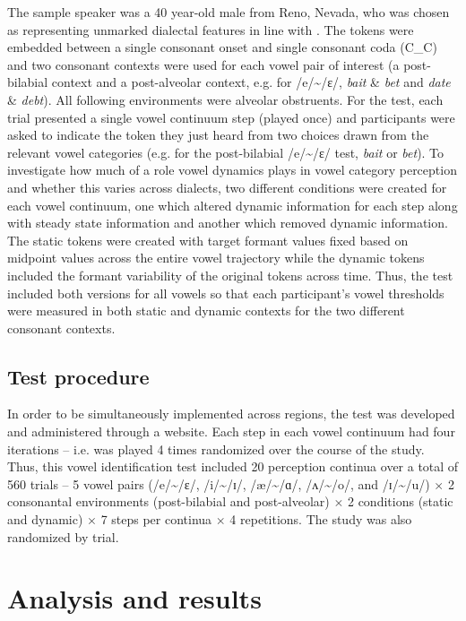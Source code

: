\documentclass[output=paper]{LSP/langsci}
\begin{document}
The sample speaker was a 40 year-old male from Reno, Nevada, who was chosen as representing unmarked dialectal features in line with \citet{clopper_acoustic_2004}. The tokens were embedded between a single consonant onset and single consonant coda (C\_C) and two consonant contexts were used for each vowel pair of interest (a post-bilabial context and a post-alveolar context, e.g. for /e/{\textasciitilde}/ɛ/, \textit{bait} \& \textit{bet} and\textit{ date} \& \textit{debt}). All following environments were alveolar obstruents. For the test, each trial presented a single vowel continuum step (played once) and participants were asked to indicate the token they just heard from two choices drawn from the relevant vowel categories (e.g. for the post-bilabial /e/{\textasciitilde}/ɛ/ test, \textit{bait} or \textit{bet}). To investigate how much of a role vowel dynamics plays in vowel category perception and whether this varies across dialects, two different conditions were created for each vowel continuum, one which altered dynamic information for each step along with steady state information and another which removed dynamic information. The static tokens were created with target formant values fixed based on midpoint values across the entire vowel trajectory while the dynamic tokens included the formant variability of the original tokens across time. Thus, the test included both versions for all vowels so that each participant’s vowel thresholds were measured in both static and dynamic contexts for the two different consonant contexts. 

\subsection{Test procedure}
In order to be simultaneously implemented across regions, the test was developed and administered through a website. Each step in each vowel continuum had four iterations – i.e. was played 4 times randomized over the course of the study. Thus, this vowel identification test included 20 perception continua over a total of 560 trials – 5 vowel pairs (/e/{\textasciitilde}/ɛ/, /i/{\textasciitilde}/ɪ/, /æ/{\textasciitilde}/ɑ/, /ʌ/{\textasciitilde}/o/, and /ɪ/{\textasciitilde}/u/) $\times$ 2 consonantal environments (post-bilabial and post-alveolar) $\times$ 2 conditions (static and dynamic) $\times$ 7 steps per continua $\times$ 4 repetitions. The study was also randomized by trial. 

\section{Analysis and results}
\end{document}
